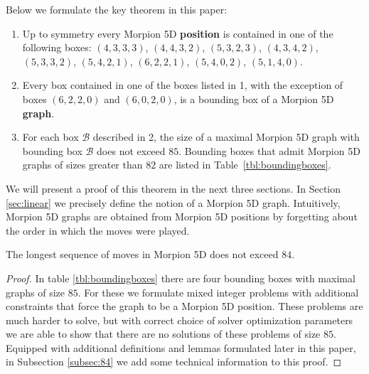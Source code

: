 Below we formulate the key theorem in this paper: %
\begin{theorem}
\begin{enumerate}
\item Up to symmetry every Morpion 5D {\bf position} is contained in one of the following boxes:
$(4, 3, 3, 3)$, $(4, 4, 3, 2)$, $(5, 3, 2, 3)$, $(4, 3, 4, 2)$, $(5, 3, 3, 2)$, $(5, 4, 2, 1)$, 
$(6, 2, 2, 1)$, $(5, 4, 0, 2)$, $(5, 1, 4, 0)$.
\item Every box contained in one of the boxes listed in 1, with the exception of boxes $(6, 2, 2, 0)$ 
  and $(6, 0, 2, 0)$, is a bounding box of a Morpion 5D {\bf graph}.
\item For each box $\mathcal{B}$ described in 2, the size of a maximal Morpion 5D graph with bounding box $\mathcal{B}$ does not exceed $85$.
  Bounding boxes that admit Morpion 5D graphs of sizes greater than $82$ are listed 
    in Table~\ref{tbl:boundingboxes}. 
\end{enumerate} 
\label{thm:boxes}
\end{theorem}
We will present a proof of this theorem in the next three sections. 
In Section \ref{sec:linear} we precisely define the notion of a Morpion 5D graph. Intuitively, Morpion 5D graphs are obtained from Morpion 5D positions by forgetting about the order in which the moves were played.





\begin{corollary}
\label{cor:84}
The longest sequence of moves in Morpion 5D does not exceed $84$.
\end{corollary}
\begin{proof} 
In table \ref{tbl:boundingboxes} there are four bounding boxes with maximal graphs of size $85$. 
For these we formulate mixed integer problems with additional constraints that force the graph to
  be a Morpion 5D position.
These problems are much harder to solve, but with correct choice of solver optimization parameters we are able to show
  that there are no solutions of these problems of size $85$. Equipped with additional definitions and lemmas formulated later in this paper, in Subsection \ref{subsec:84} we add some technical 
information to this proof. 
\end{proof}


